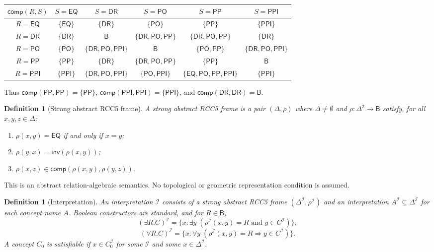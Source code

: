 \documentclass[11pt]{article}
\newtheorem{definition}[theorem]{Definition}
\newcommand{\Base}{\mathsf{B}}
\newcommand{\EQ}{\mathsf{EQ}}
\newcommand{\DR}{\mathsf{DR}}
\newcommand{\PO}{\mathsf{PO}}
\newcommand{\PP}{\mathsf{PP}}
\newcommand{\PPI}{\mathsf{PPI}}
\newcommand{\Inv}{\mathsf{inv}}
\newcommand{\comp}{\mathsf{comp}}
\newcommand{\I}{\mathcal I}
\begin{document}
\begin{center}
\renewcommand{\arraystretch}{1.18}
\begin{tabular}{c|ccccc}
\toprule
$\comp(R,S)$ & $S=\EQ$ & $S=\DR$ & $S=\PO$ & $S=\PP$ & $S=\PPI$ \\
\midrule
$R=\EQ$  & $\{\EQ\}$ & $\{\DR\}$ & $\{\PO\}$ & $\{\PP\}$ & $\{\PPI\}$ \\
$R=\DR$  & $\{\DR\}$ & $\Base$ & $\{\DR,\PO,\PP\}$ & $\{\DR,\PO,\PP\}$ & $\{\DR\}$ \\
$R=\PO$  & $\{\PO\}$ & $\{\DR,\PO,\PPI\}$ & $\Base$ & $\{\PO,\PP\}$ & $\{\DR,\PO,\PPI\}$ \\
$R=\PP$  & $\{\PP\}$ & $\{\DR\}$ & $\{\DR,\PO,\PP\}$ & $\{\PP\}$ & $\Base$ \\
$R=\PPI$ & $\{\PPI\}$ & $\{\DR,\PO,\PPI\}$ & $\{\PO,\PPI\}$ & $\{\EQ,\PO,\PP,\PPI\}$ & $\{\PPI\}$ \\
\bottomrule
\end{tabular}
\end{center}

Thus $\comp(\PP,\PP)=\{\PP\}$, $\comp(\PPI,\PPI)=\{\PPI\}$, and $\comp(\DR,\DR)=\Base$.

\begin{definition}[Strong abstract RCC5 frame]
A strong abstract RCC5 frame is a pair $(\Delta,\rho)$ where $\Delta\ne\emptyset$ and $\rho:\Delta^2\to\Base$ satisfy, for all $x,y,z\in\Delta$:
\begin{enumerate}[label=(F\arabic*)]
\item $\rho(x,y)=\EQ$ if and only if $x=y$;
\item $\rho(y,x)=\Inv(\rho(x,y))$;
\item $\rho(x,z)\in\comp(\rho(x,y),\rho(y,z))$.
\end{enumerate}
\end{definition}

This is an abstract relation-algebraic semantics.  No topological or geometric representation condition is assumed.

\begin{definition}[Interpretation]
An interpretation $\I$ consists of a strong abstract RCC5 frame $(\Delta^\I,\rho^\I)$ and an interpretation $A^\I\subseteq\Delta^\I$ for each concept name $A$.  Boolean constructors are standard, and for $R\in\Base$,
\[
  (\exists R.C)^\I=\{x: \exists y\; (\rho^\I(x,y)=R \text{ and } y\in C^\I)\},
\]
\[
  (\forall R.C)^\I=\{x: \forall y\; (\rho^\I(x,y)=R \Rightarrow y\in C^\I)\}.
\]
A concept $C_0$ is satisfiable if $x\in C_0^\I$ for some $\I$ and some $x\in\Delta^\I$.
\end{definition}
\end{document}
